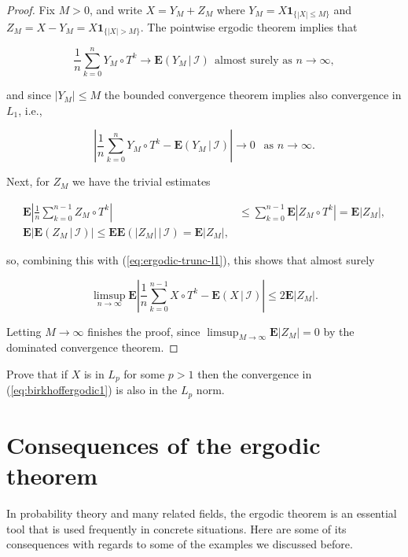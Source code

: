 \begin{proof}
Fix $M>0$, and write $X=Y_M + Z_M$ where
$Y_M = X \mathbf{1}_{\{|X|\le M\}}$ and
$Z_M = X-Y_M = X \mathbf{1}_{\{|X|>M\}}$. The
pointwise ergodic theorem implies that

\[
\frac{1}{n} \sum_{k=0}^n Y_M \circ T^k \to \mathbf{E}\left(Y_M\,|\,\mathcal{I}\right)
 \ \ \textrm{almost surely as }n\to\infty,
\]

\noindent and since $|Y_M|\le M$ the bounded convergence
theorem implies also convergence in $L_1$, i.e.,

\begin{equation*} \tag{20}\label{eq:ergodic-trunc-l1}
\left|\frac{1}{n} \sum_{k=0}^n Y_M \circ T^k - \mathbf{E}\left(Y_M\,|\,\mathcal{I}\right)\right| \to 0 \ \ \textrm{ as }n\to\infty.
\end{equation*}

\noindent Next, for $Z_M$ we have the trivial estimates

\begin{align*}
\mathbf{E} \left| \frac{1}{n} \sum_{k=0}^{n-1} Z_M \circ T^k \right|
& \le \sum_{k=0}^{n-1} \mathbf{E}|Z_M \circ T^k| = \mathbf{E}|Z_M|, \\
\mathbf{E} \left| \mathbf{E}\left(Z_M\,|\,\mathcal{I}\right) \right| \le \mathbf{E} \mathbf{E}\left(|Z_M|\,|\,\mathcal{I}\right) = \mathbf{E}|Z_M|,
\end{align*}

\noindent so, combining this with (\ref{eq:ergodic-trunc-l1}), this
shows that almost surely

\[
\limsup_{n\to\infty} \mathbf{E}\left| \frac{1}{n} \sum_{k=0}^{n-1} X\circ T^k - \mathbf{E}\left(X\,|\,\mathcal{I}\right)\right|
\le 2 \mathbf{E}|Z_M|.
\]

\noindent Letting $M\to\infty$ finishes the proof, since
$\limsup_{M\to\infty} \mathbf{E}|Z_M| = 0$ by the
dominated convergence theorem.
\end{proof}

\begin{xexercise}
Prove that if $X$ is in $L_p$ for some $p>1$ then the
convergence in (\ref{eq:birkhoffergodic1})  is also in the
$L_p$ norm.
\end{xexercise}

\section{Consequences of the ergodic theorem}
In probability theory and many related fields, the
ergodic theorem is an essential tool that is used
frequently in concrete situations. Here are some of
its consequences with regards to some of the examples
we discussed before.

